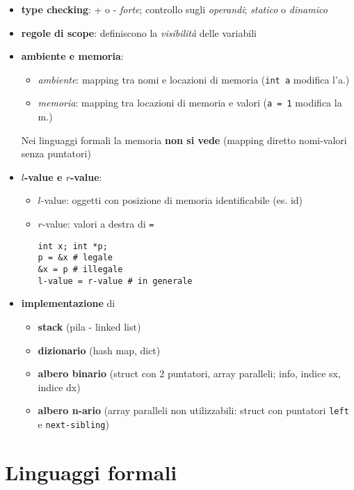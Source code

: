 \begin{itemize}
  \item \textbf{type checking}: + o - \textit{forte}; controllo sugli \textit{operandi}; \textit{statico} o \textit{dinamico}
  \item \textbf{regole di scope}: definiscono la \textit{visibilit\`a} delle variabili
  \item \textbf{ambiente e memoria}:
    \begin{itemize}
      \item \textit{ambiente}: mapping tra nomi e locazioni di memoria (\lstinline|int a| modifica l'a.)
      \item \textit{memoria}: mapping tra locazioni di memoria e valori (\lstinline|a = 1| modifica la m.)
    \end{itemize}
    Nei linguaggi formali la memoria \textbf{non si vede} (mapping diretto nomi-valori senza puntatori)
  \item \textbf{$l$-value e $r$-value}:
    \begin{itemize}
      \item $l$-value: oggetti con posizione di memoria identificabile (es. id)
      \item $r$-value: valori a destra di \lstinline|=|
        \begin{lstlisting}
int x; int *p;
p = &x # legale
&x = p # illegale
l-value = r-value # in generale\end{lstlisting}
    \end{itemize}
  \item \textbf{implementazione} di
    \begin{itemize}
      \item \textbf{stack} (pila - linked list)
      \item \textbf{dizionario} (hash map, dict)
      \item \textbf{albero binario} (struct con 2 puntatori, array paralleli; info, indice sx, indice dx)
      \item \textbf{albero n-ario} (array paralleli non utilizzabili: struct con puntatori \lstinline|left| e \lstinline|next-sibling|)
    \end{itemize}
    
\end{itemize}

\section{Linguaggi formali}


